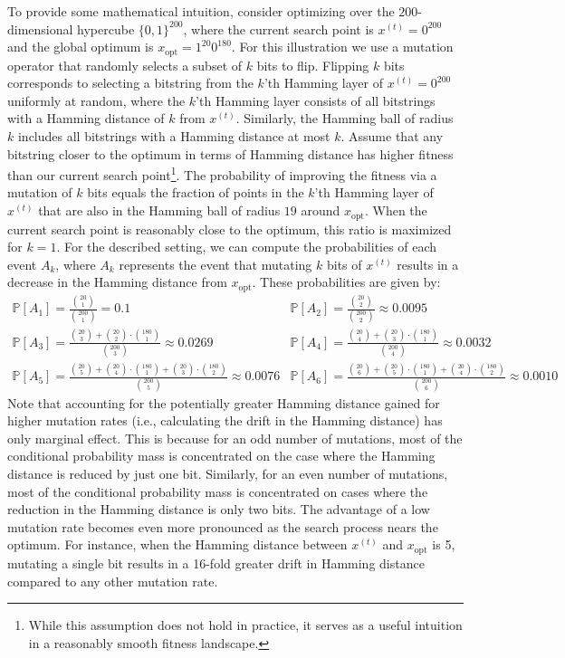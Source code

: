 To provide some mathematical intuition, consider optimizing over the $200$-dimensional hypercube $\{0,1\}^{200}$, where the current search point is $x^{(t)}=0^{200}$ and the global optimum is $x_{\text{opt}} = 1^{20} 0^{180}$. For this illustration we use a mutation operator that randomly selects a subset of $k$ bits to flip. Flipping $k$ bits corresponds to selecting a bitstring from the $k$'th Hamming layer of $x^{(t)}=0^{200}$ uniformly at random, where the $k$'th Hamming layer consists of all bitstrings with a Hamming distance of $k$ from $x^{(t)}$. Similarly, the Hamming ball of radius $k$ includes all bitstrings with a Hamming distance at most $k$. Assume that any bitstring closer to the optimum in terms of Hamming distance has higher fitness than our current search point\footnote{While this assumption does not hold in practice, it serves as a useful intuition in a reasonably smooth fitness landscape.}. The probability of improving the fitness via a mutation of $k$ bits equals the fraction of points in the $k$'th Hamming layer of $x^{(t)}$ that are also in the Hamming ball of radius $19$ around $x_{\text{opt}}$. When the current search point is reasonably close to the optimum, this ratio is maximized for $k=1$. For the described setting, we can compute the probabilities of each event $A_k$, where $A_k$ represents the event that mutating $k$ bits of $x^{(t)}$ results in a decrease in the Hamming distance from $x_{\text{opt}}$. These probabilities are given by: 
\[
\begin{array}{ll}
\mathbb{P}[A_1] = \frac{\binom{20}{1}}{\binom{200}{1}} = 0.1 
& \mathbb{P}[A_2] = \frac{\binom{20}{2}}{\binom{200}{2}} \approx 0.0095 \\  [10pt]
\mathbb{P}[A_3] = \frac{\binom{20}{3}+\binom{20}{2}\cdot \binom{180}{1}}{\binom{200}{3}} \approx 0.0269 &
\mathbb{P}[A_4] = \frac{\binom{20}{4}+\binom{20}{3}\cdot \binom{180}{1}}{\binom{200}{4}} \approx 0.0032 \\ [10pt]
\mathbb{P}[A_5] = \frac{\binom{20}{5}+\binom{20}{4}\cdot \binom{180}{1}+\binom{20}{3} \cdot \binom{180}{2}}{\binom{200}{5}} \approx 0.0076 & 
\mathbb{P}[A_6]= \frac{\binom{20}{6}+\binom{20}{5}\cdot \binom{180}{1} + \binom{20}{4} \cdot \binom{180}{2}}{\binom{200}{6}} \approx 0.0010
\end{array}
\]
 Note that accounting for the potentially greater Hamming distance gained for higher mutation rates (i.e., calculating the drift in the Hamming distance) has only marginal effect. This is because for an odd number of mutations, most of the conditional probability mass is concentrated on the case where the Hamming distance is reduced by just one bit. Similarly, for an even number of mutations, most of the conditional probability mass is concentrated on cases where the reduction in the Hamming distance is only two bits. The advantage of a low mutation rate becomes even more pronounced as the search process nears the optimum. For instance, when the Hamming distance between $x^{(t)}$ and $x_{\text{opt}}$ is 5, mutating a single bit results in a 16-fold greater drift in Hamming distance compared to any other mutation rate. 


